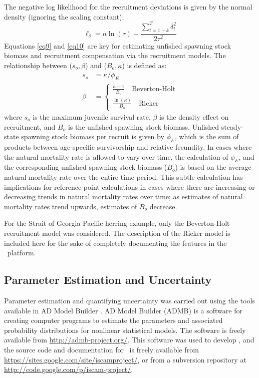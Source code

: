 The negative log likelihood for the recruitment deviations is given by the normal density (ignoring the scaling constant):
\begin{equation}\label{eq10}
 \ell_\delta = n\ln(\tau) + \frac{\sum_{t=1+k}^T \delta^2_t}{2\tau^2}
\end{equation}
Equations \eqref{eq9} and \eqref{eq10} are key for estimating unfished spawning stock biomass and recruitment compensation via the recruitment models.  The relationship between ($s_o,\beta$) and ($B_o,\kappa$) is defined as:
\begin{align}
s_o &= \kappa/\phi_E\\
\beta&=\begin{cases}
\frac{\kappa-1}{B_o} \quad \mbox{Beverton-Holt}\\[1ex]
\frac{\ln(\kappa)}{B_o} \quad \mbox{Ricker}
\end{cases}
\end{align}
where $s_o$ is the maximum juvenile survival rate, $\beta$ is the density effect on recruitment, and $B_o$ is the unfished spawning stock biomass. Unfished steady-state spawning stock biomass per recruit is given by $\phi_E$, which is the sum of products between age-specific survivorship and relative fecundity.  In cases where the natural mortality rate is allowed to vary over time, the calculation of $\phi_E$, and the corresponding unfished spawning stock biomass ($B_o$) is based on the average natural mortality rate over the entire time period.  This subtle calculation has implications for reference point calculations in cases where there are increasing or decreasing trends in natural mortality rates over time; as estimates of natural mortality rates trend upwards, estimates of $B_o$ decrease. 

For the Strait of Georgia Pacific herring example, only the Beverton-Holt recruitment model was considered.  The description of the Ricker model is included here for the sake of completely documenting the features in the \iscam\ platform.

		
	\subsection{Parameter Estimation and Uncertainty}
	
Parameter estimation and quantifying uncertainty was carried out using the tools available in AD Model Builder \citep{ADMB2009}.  AD Model Builder (ADMB) is a software for creating computer programs to estimate the parameters and associated probability distributions for nonlinear statistical models.  The software is freely available from \url{http://admb-project.org/}.  This software was used to develop \iscam, and the source code and documentation for \iscam\ is freely available from \url{https://sites.google.com/site/iscamproject/}, or from a subversion repository at \url{http://code.google.com/p/iscam-project/}.  

